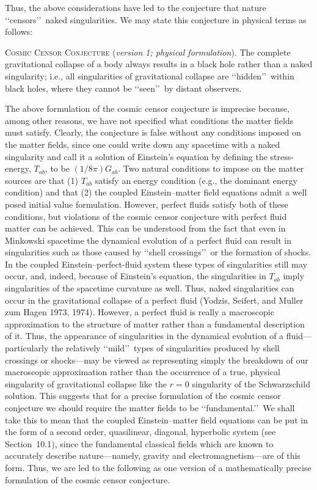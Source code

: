 Thus, the above considerations have led to the conjecture that nature \lq\lq censors\rq\rq\
naked singularities. We may state this conjecture in physical terms as follows:

\medskip
\noindent\textsc{Cosmic Censor Conjecture} (\emph{version 1; physical formulation}).
The complete gravitational collapse of a body always results in a black hole rather
than a naked singularity; i.e., all singularities of gravitational collapse are
\lq\lq hidden\rq\rq\ within black holes, where they cannot be \lq\lq seen\rq\rq\ by distant
observers.
\medskip

The above formulation of the cosmic censor conjecture is imprecise because, among
other reasons, we have not specified what conditions the matter fields must satisfy.
Clearly, the conjecture is false without any conditions imposed on the matter fields,
since one could write down any spacetime with a naked singularity and call it a
solution of Einstein's equation by defining the stress-energy, \(T_{ab}\), to be
\((1/8\pi)G_{ab}\). Two natural conditions to impose on the matter sources are that
(1) \(T_{ab}\) satisfy an energy condition (e.g., the dominant energy condition) and
that (2) the coupled Einstein--matter field equations admit a well posed initial value
formulation. However, perfect fluids satisfy both of these conditions, but violations
of the cosmic censor conjecture with perfect fluid matter can be achieved. This can
be understood from the fact that even in Minkowski spacetime the dynamical
evolution of a perfect fluid can result in singularities such as those caused by
\lq\lq shell crossings\rq\rq\ or the formation of shocks. In the coupled
Einstein--perfect-fluid system these types of singularities still may occur, and,
indeed, because of Einstein's equation, the singularities in \(T_{ab}\) imply
singularities of the spacetime curvature as well. Thus, naked singularities can occur
in the gravitational collapse of a perfect fluid (Yodzis, Seifert, and Muller zum
Hagen 1973, 1974). However, a perfect fluid is really a macroscopic approximation
to the structure of matter rather than a fundamental description of it. Thus, the
appearance of singularities in the dynamical evolution of a fluid---particularly the
relatively \lq\lq mild\rq\rq\ types of singularities produced by shell crossings or
shocks---may be viewed as representing simply the breakdown of our macroscopic
approximation rather than the occurrence of a true, physical singularity of
gravitational collapse like the \(r=0\) singularity of the Schwarzschild solution.
This suggests that for a precise formulation of the cosmic censor conjecture we should
require the matter fields to be \lq\lq fundamental.\rq\rq\ We shall take this to mean
that the coupled Einstein--matter field equations can be put in the form of a second
order, quasilinear, diagonal, hyperbolic system (see Section~10.1), since the
fundamental classical fields which are known to accurately describe nature---namely,
gravity and electromagnetism---are of this form. Thus, we are led to the following as
one version of a mathematically precise formulation of the cosmic censor conjecture.

